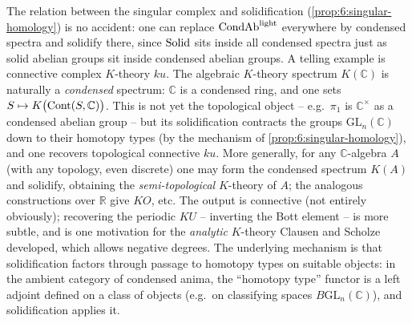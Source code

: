 \begin{remark}
\label{rmk:6:K-theory}
The relation between the singular complex and solidification
(\cref{prop:6:singular-homology}) is no accident: one can replace $\mathrm{CondAb}^{\mathrm{light}}$
everywhere by condensed spectra and solidify there, since $\mathrm{Solid}$ sits inside
all condensed spectra just as solid abelian groups sit inside condensed abelian
groups. A telling example is connective complex $K$-theory $ku$. The algebraic
$K$-theory spectrum $K(\mathbb{C})$ is naturally a \emph{condensed} spectrum:
$\mathbb{C}$ is a condensed ring, and one sets
$S\mapsto K\bigl(\operatorname{Cont}(S,\mathbb{C})\bigr)$. This is not yet the topological
object -- e.g.\ $\pi_1$ is $\mathbb{C}^{\times}$ as a condensed abelian group --
but its solidification contracts the groups $\mathrm{GL}_n(\mathbb{C})$ down to
their homotopy types (by the mechanism of \cref{prop:6:singular-homology}), and
one recovers topological connective $ku$. More generally, for any
$\mathbb{C}$-algebra $A$ (with any topology, even discrete) one may form the
condensed spectrum $K(A)$ and solidify, obtaining the \emph{semi-topological}
$K$-theory of $A$; the analogous constructions over $\mathbb{R}$ give $KO$, etc.
The output is connective (not entirely obviously); recovering the periodic $KU$
-- inverting the Bott element -- is more subtle, and is one motivation for the
\emph{analytic} $K$-theory Clausen and Scholze developed, which allows negative
degrees. The underlying mechanism is that solidification factors through passage
to homotopy types on suitable objects: in the ambient category of condensed
anima, the ``homotopy type'' functor is a left adjoint defined on a class of
objects (e.g.\ on classifying spaces $B\mathrm{GL}_n(\mathbb{C})$), and
solidification applies it.
\end{remark}
